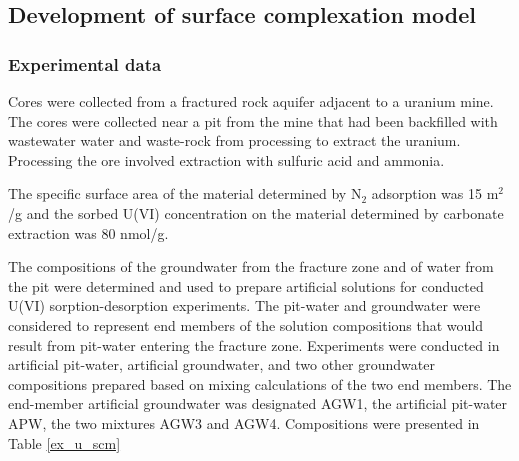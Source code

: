 \subsection{Development of surface complexation model}

\subsubsection{Experimental data}

Cores were collected from a fractured rock aquifer adjacent to a 
uranium mine. The cores were collected near a pit from the mine that had 
been backfilled with wastewater water and waste-rock from processing 
to extract the uranium. Processing the ore involved extraction 
with sulfuric acid and ammonia. 

The specific surface area of the material determined 
by N$_2$ adsorption was 15 m$^2$/g and the sorbed U(VI) 
concentration on the material determined by carbonate 
extraction \citep{KohlerMatthias2004MfEA} was 80 nmol/g.

The compositions of the groundwater from the fracture zone 
and of water from the pit were determined and used to 
prepare artificial solutions for conducted U(VI) sorption-desorption 
experiments.  The pit-water and groundwater were considered to 
represent end members of the solution compositions that would 
result from pit-water entering the fracture zone.  
Experiments were conducted in artificial pit-water, 
artificial groundwater, and two other groundwater compositions 
prepared based on mixing calculations of the two end members.  
The end-member artificial groundwater was designated AGW1, 
the artificial pit-water APW, the two mixtures AGW3 and AGW4.  
Compositions were presented in Table \ref{ex_u_scm}

